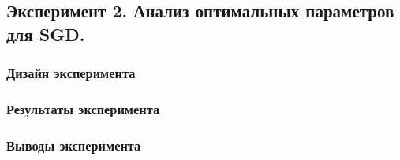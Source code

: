 \subsection{Эксперимент 2. Анализ оптимальных  параметров для SGD.}
\subsubsection{Дизайн эксперимента}
\subsubsection{Результаты эксперимента}
\subsubsection{Выводы эксперимента}